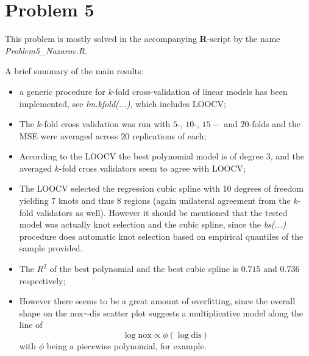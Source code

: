 \documentclass[a4paper]{article}
\begin{document}

\clearpage

\section{Problem 5} %
\label{sec:problem_5}

This problem is mostly solved in the accompanying \textbf{R}-script by the name \emph{Problem5\_Nazarov.R}.

A brief summary of the main results:
\begin{itemize}
	\item a generic procedure for $k$-fold cross-validation of linear models has been implemented, see \emph{lm.kfold(...)}, which includes LOOCV;
	\item The $k$-fold cross validation was run with $5$-, $10$-, $15-$ and $20$-folds and the MSE were averaged across $20$ replications of each;
	\item According to the LOOCV the best polynomial model is of degree $3$, and the averaged $k$-fold cross validators seem to agree with LOOCV;
	\item The LOOCV selected the regression cubic spline with 10 degrees of freedom yielding $7$ knots and thus $8$ regions (again unilateral agreement from the $k$-fold validators as well). However it should be mentioned that the tested model was actually knot selection and the cubic spline, since the \emph{bs(...)} procedure does automatic knot selection based on empirical quantiles of the sample provided.
	\item The $R^2$ of the best polynomial and the best cubic spline is $0.715$ and $0.736$ respectively;
	\item However there seems to be a great amount of overfitting, since the overall shape on the nox$\sim$dis scatter plot suggests a multiplicative model along the line of 
	\[\log\text{nox}\propto \phi(\log\text{dis})\]
	with $\phi$ being a piecewise polynomial, for example.
\end{itemize}

\end{document}
